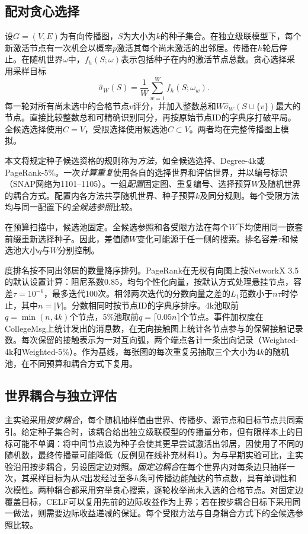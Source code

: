 \documentclass[smallextended]{svjour3}
\begin{document}
\subsection{配对贪心选择}\label{sec:paired}
设$G=(V,E)$为有向传播图，$S$为大小为$k$的种子集合。在独立级联模型下，每个新激活节点有一次机会以概率$p$激活其每个尚未激活的出邻居。传播在$h$轮后停止。在随机世界$\omega$中，$f_h(S;\omega)$表示包括种子在内的激活节点总数。贪心选择采用采样目标
\begin{equation}
\widehat\sigma_W(S)=\frac{1}{W}\sum_{w=1}^{W}f_h(S;\omega_w).
\end{equation}
每一轮对所有尚未选中的合格节点$v$评分，并加入整数总和$W\widehat\sigma_W(S\cup\{v\})$最大的节点。直接比较整数总和可精确识别同分，再按原始节点ID的字典序打破平局。全候选选择使用$C=V$，受限选择使用候选池$C\subset V$。两者均在完整传播图上模拟。

本文将规定种子候选资格的规则称为\emph{方法}，如全候选选择、Degree-4k或PageRank-5\%。一次\emph{计算重复}使用各自的选择世界和评估世界，并以编号标识（SNAP网络为1101--1105）。一组\emph{配置}固定图、重复编号、选择预算$W$及随机世界的耦合方式。配置内各方法共享随机世界、种子预算$k$及同分规则。每个受限方法均与同一配置下的\emph{全候选参照}比较。

在预算扫描中，候选池固定。全候选参照和各受限方法在每个$W$下均使用同一嵌套前缀重新选择种子。因此，差值随$W$变化可能源于任一侧的搜索。排名容差$\tau$和候选池大小$q$与$W$分别控制。

度排名按不同出邻居的数量降序排列。PageRank在无权有向图上按NetworkX 3.5的默认设置计算：阻尼系数0.85，均匀个性化向量，按默认方式处理悬挂节点，容差$\tau=10^{-6}$，最多迭代100次\cite{networkxpr}。相邻两次迭代的分数向量之差的$L_1$范数小于$n\tau$时停止，其中$n=|V|$。分数相同时按节点ID的字典序排序。4k池取前$q=\min(n,4k)$个节点，5\%池取前$q=\lceil0.05n\rceil$个节点。事件加权度在CollegeMsg上统计发出的消息数，在无向接触图上统计各节点参与的保留接触记录数。每次保留的接触表示为一对互向弧，两个端点各计一条出向记录（Weighted-4k和Weighted-5\%）。作为基线，每张图的每次重复另抽取三个大小为$4k$的随机池，在不同预算和耦合方式下复用。

\subsection{世界耦合与独立评估}\label{sec:coupling}
主实验采用\emph{按步耦合}，每个随机抽样值由世界、传播步、源节点和目标节点共同索引。给定种子集合时，该耦合给出独立级联模型的传播量分布，但有限样本上的目标可能不单调：将中间节点设为种子会使其更早尝试激活出邻居，因使用了不同的随机数，最终传播量可能降低（反例见在线补充材料1）。为与早期实验可比，主实验沿用按步耦合，另设固定边对照。\emph{固定边耦合}在每个世界内对每条边只抽样一次，其采样目标为从$S$出发经过至多$h$条可传播边能触达的节点数，具有单调性和次模性。两种耦合都采用穷举贪心搜索，逐轮枚举尚未入选的合格节点。对固定边覆盖目标，CELF可以复用先前的边际收益作为上界；若在按步耦合目标下采用同一做法，则需要边际收益递减的保证。每个受限方法与自身耦合方式下的全候选参照比较。
\end{document}
